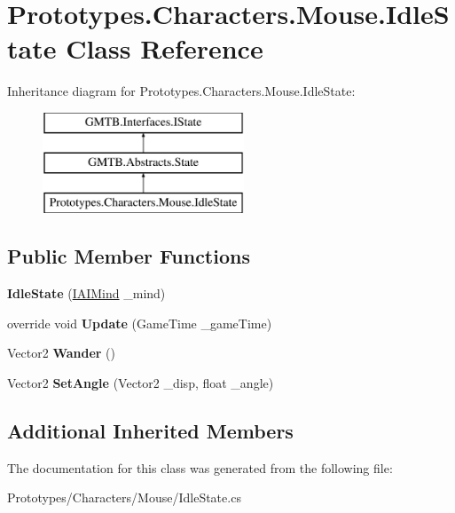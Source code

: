 \hypertarget{class_prototypes_1_1_characters_1_1_mouse_1_1_idle_state}{}\section{Prototypes.\+Characters.\+Mouse.\+Idle\+State Class Reference}
\label{class_prototypes_1_1_characters_1_1_mouse_1_1_idle_state}
Inheritance diagram for Prototypes.\+Characters.\+Mouse.\+Idle\+State\+:\begin{figure}[H]
\begin{center}
\leavevmode
\includegraphics[height=3.000000cm]{class_prototypes_1_1_characters_1_1_mouse_1_1_idle_state}
\end{center}
\end{figure}
\subsection*{Public Member Functions}
\begin{DoxyCompactItemize}
\item 
\mbox{\label{class_prototypes_1_1_characters_1_1_mouse_1_1_idle_state_a6f41ab9ab7069c99d94761ac760bb1ac}} 
{\bfseries Idle\+State} (\mbox{\hyperlink{interface_g_m_t_b_1_1_interfaces_1_1_i_a_i_mind}{I\+A\+I\+Mind}} \+\_\+mind)
\item 
\mbox{\label{class_prototypes_1_1_characters_1_1_mouse_1_1_idle_state_a8e59207b7bdd63cc58fe633c9a6021ae}} 
override void {\bfseries Update} (Game\+Time \+\_\+game\+Time)
\item 
\mbox{\label{class_prototypes_1_1_characters_1_1_mouse_1_1_idle_state_a71a503d5a7ce7eb7f4906044edc14964}} 
Vector2 {\bfseries Wander} ()
\item 
\mbox{\label{class_prototypes_1_1_characters_1_1_mouse_1_1_idle_state_ab6049128200c0430abe670f7e59f8e67}} 
Vector2 {\bfseries Set\+Angle} (Vector2 \+\_\+disp, float \+\_\+angle)
\end{DoxyCompactItemize}
\subsection*{Additional Inherited Members}


The documentation for this class was generated from the following file\+:\begin{DoxyCompactItemize}
\item 
Prototypes/\+Characters/\+Mouse/Idle\+State.\+cs\end{DoxyCompactItemize}
